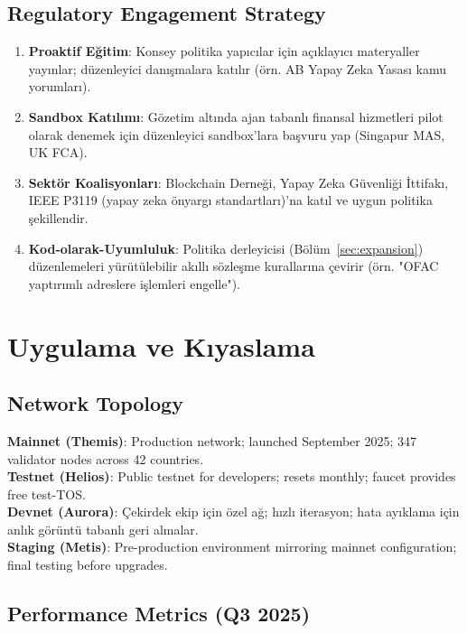 \documentclass[11pt]{article}
\begin{document}
\begin{itemize}[noitemsep]
\begin{itemize}[noitemsep]
\begin{itemize}[noitemsep]
\begin{itemize}[noitemsep]
\begin{itemize}[noitemsep]
\begin{itemize}[noitemsep]
\begin{itemize}[noitemsep]
\begin{enumerate}[noitemsep]
\begin{itemize}[noitemsep]
\subsection{Regulatory Engagement Strategy}

\begin{enumerate}[noitemsep]
  \item \textbf{Proaktif Eğitim}: Konsey politika yapıcılar için açıklayıcı materyaller yayınlar; düzenleyici danışmalara katılır (örn. AB Yapay Zeka Yasası kamu yorumları).
  \item \textbf{Sandbox Katılımı}: Gözetim altında ajan tabanlı finansal hizmetleri pilot olarak denemek için düzenleyici sandbox'lara başvuru yap (Singapur MAS, UK FCA).
  \item \textbf{Sektör Koalisyonları}: Blockchain Derneği, Yapay Zeka Güvenliği İttifakı, IEEE P3119 (yapay zeka önyargı standartları)'na katıl ve uygun politika şekillendir.
  \item \textbf{Kod-olarak-Uyumluluk}: Politika derleyicisi (Bölüm~\ref{sec:expansion}) düzenlemeleri yürütülebilir akıllı sözleşme kurallarına çevirir (örn. "OFAC yaptırımlı adreslere işlemleri engelle").
\end{enumerate}

\section{Uygulama ve Kıyaslama}
\label{sec:implementation}

\subsection{Network Topology}

\textbf{Mainnet (Themis)}: Production network; launched September 2025; 347 validator nodes across 42 countries.\\
\textbf{Testnet (Helios)}: Public testnet for developers; resets monthly; faucet provides free test-TOS.\\
\textbf{Devnet (Aurora)}: Çekirdek ekip için özel ağ; hızlı iterasyon; hata ayıklama için anlık görüntü tabanlı geri almalar.\\
\textbf{Staging (Metis)}: Pre-production environment mirroring mainnet configuration; final testing before upgrades.

\subsection{Performance Metrics (Q3 2025)}


\end{itemize}
\end{enumerate}
\end{itemize}
\end{itemize}
\end{itemize}
\end{itemize}
\end{itemize}
\end{itemize}
\end{itemize}
\end{document}
